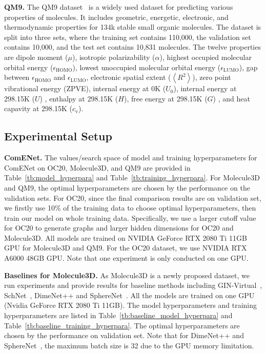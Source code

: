 \documentclass{article}
\begin{document}
\textcolor{COLOR}{\textbf{QM9.} The QM9 dataset~\citep{ramakrishnan2014quantum} is a widely used dataset for predicting various properties of molecules. It includes geometric, energetic, electronic, and thermodynamic properties for 134k stable small organic molecules. The dataset is split into three sets, where the training set contains 110,000, the validation set contains 10,000, and the test set contains 10,831 molecules. The twelve properties are dipole moment ($\mu$), isotropic polarizability ($\alpha$), highest occupied molecular orbital energy ($\epsilon_\text{HOMO}$), lowest unoccupied molecular orbital energy ($\epsilon_\text{LUMO}$), gap between $\epsilon_\text{HOMO}$ and $\epsilon_\text{LUMO}$, electronic spatial extent ($\left< R^2 \right>$), zero point vibrational energy (ZPVE), internal energy at 0K ($U_0$), internal energy at 298.15K ($U$) , enthalpy at 298.15K ($H$), free energy at 298.15K ($G$) , and heat capavity at 298.15K ($c_\text{v}$). }

\subsection{Experimental Setup}   \label{sec:setup}
\textbf{ComENet.} The values/search space of model and training hyperparameters for ComENet on OC20, Molecule3D, and QM9 are provided in Table~\ref{tb:model_hyperpara} and Table~\ref{tb:training_hyperpara}. For Molecule3D and QM9, the optimal hyperparameters are chosen by the performance on the validation sets. For OC20, since the final comparison results are on validation set, we firstly use 10\% of the training data to choose optimal hyperparameters, then train our model on whole training data.
Specifically, we use a larger cutoff value for OC20 to generate graphs and larger hidden dimensions for OC20 and Molecule3D.
All models are trained on NVIDIA GeForce RTX 2080 Ti 11GB GPU for Molecule3D and QM9. 
For the OC20 dataset, we use NVIDIA RTX A6000 48GB GPU. Note that one experiment is only conducted on one GPU.

\textbf{Baselines for Molecule3D.} As Molecule3D is a newly proposed dataset, we run experiments and provide results for baseline methods including GIN-Virtual~\cite{hu2021ogb}, SchNet~\cite{schutt2017schnet}, DimeNet++\cite{klicpera_dimenetpp_2020} and SphereNet~\cite{liu2022spherical}. 
All the models are trained on one GPU (Nvidia GeForce RTX 2080 Ti 11GB). The model hyperparameters and training hyperparameters are listed in Table~\ref{tb:baseline_model_hyperpara} and Table~\ref{tb:baseline_training_hyperpara}. The optimal hyperparameters are chosen by the performance on validation set. Note that for DimeNet++\cite{klicpera_dimenetpp_2020} and SphereNet~\cite{liu2022spherical}, the maximum batch size is 32 due to the GPU memory limitation.
\end{document}
